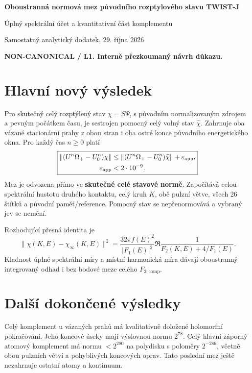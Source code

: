 \documentclass[11pt,a4paper]{article}
\theoremstyle{remark}\newtheorem{remark}[theorem]{Poznámka}
\numberwithin{equation}{section}
\begin{document}
\thispagestyle{empty}
{\Large\sffamily\bfseries Oboustranná normová mez původního rozptylového stavu TWIST-J\par}
\vspace{3mm}
{\large Úplný spektrální účet a kvantitativní část komplementu\par}
\vspace{4mm}
Samostatný analytický dodatek, 29. října 2026\par
\textbf{NON-CANONICAL / L1. Interně přezkoumaný návrh důkazu.}

\section*{Hlavní nový výsledek}

Pro skutečný celý rozptýlený stav \(\chi=S\Psi\), s původním
normalizovaným zdrojem a pevným počátkem času, je sestrojen
pomocný celý volný stav \(\widehat\chi\). Zahrnuje oba vázané
stacionární prahy z obou stran i oba ostré konce původního
energetického okna. Pro každý čas \(n\ge0\) platí
\[
\boxed{\begin{aligned}
\|(U^n\Omega_+-U_0^n)\chi\|
&\le\|(U^n\Omega_+-U_0^n)\widehat\chi\|
 +\varepsilon_{\rm app},\\
\varepsilon_{\rm app}&<2\cdot10^{-9}.
\end{aligned}}
\]
Mez je odvozena přímo ve \textbf{skutečné celé stavové normě}.
Započítává celou spektrální hustotu druhého kontaktu, celý kruh
\(K\), obě pulzní větve, všech 26 štítků a původní paměť/reference.
Pomocný stav se nepřenormovává a vybraný jev se nemění.

Rozhodující přesná identita je
\[
\boxed{\|\chi(K,E)-\chi_\infty(K,E)\|^2
=\frac{32\pi f(E)^2}{|F_1(E)|^2}
\Re\frac1{F_2(K,E)+4/F_1(E)}.}
\]
Kladnost úplné spektrální míry a místní harmonická míra dávají
oboustranný integrovaný odhad i bez bodové meze celého
\(F_{2,\mathrm{comp}}\).

\section*{Další dokončené výsledky}

Celý komplement u vázaných prahů má kvalitativně doložené
holomorfní pokračování. Jeho koncové úseky mají výslovnou
normu \(2^{78}\). Celý hlavní záporný atomový komplement
má normu \(<2^{280}\) na polydisku s poloměry \(2^{-286}\),
včetně obou pulzních větví a pohyblivých koncových oprav.
Tato poslední mez ještě nezahrnuje ostatní atomy a kontinuum.
\end{document}
